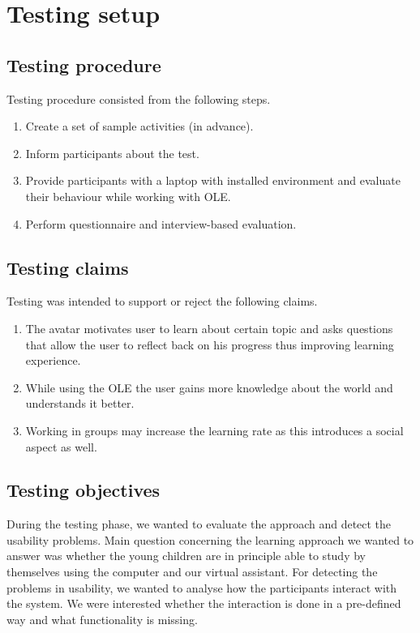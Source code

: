 \documentclass[a4paper]{article}
\begin{document}
\section{Testing setup}

\subsection{Testing procedure} 

Testing procedure consisted from the following steps.

\begin{enumerate}
	\item Create a set of sample activities (in advance).
	\item Inform participants about the test.
	\item Provide participants with a laptop with installed environment and evaluate their behaviour while working with OLE.
	\item Perform questionnaire and interview-based evaluation.
\end{enumerate}

\subsection{Testing claims}

Testing was intended to support or reject the following claims.

\begin{enumerate}
	\item The avatar motivates user to learn about certain topic and asks questions that allow the user to reflect back on his progress thus improving learning experience.
	\item While using the OLE the user gains more knowledge about the world and understands it better. 
	\item Working in groups may increase the learning rate as this introduces a social aspect as well.
\end{enumerate}

\subsection{Testing objectives}

During the testing phase, we wanted to evaluate the approach and detect the usability problems. Main question concerning the learning approach we wanted to answer was whether the young children are in principle able to study by themselves using the computer and our virtual assistant. For detecting the problems in usability, we wanted to analyse how the participants interact with the system. We were interested whether the interaction is done in a pre-defined way and what functionality is missing.
\end{document}
